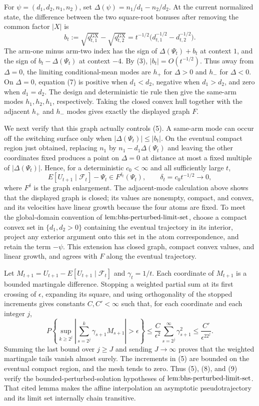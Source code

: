 For \(\psi=(d_1,d_2,n_1,n_2)\), set \(\Delta(\psi)=n_1/d_1-n_2/d_2\). At the current normalized state, the difference between the two square-root bonuses after removing the common factor \(|X|\) is
\[
 b_t:=\sqrt{q^{\mathrm{GX}}_{t,1}}-\sqrt{q^{\mathrm{GX}}_{t,2}}
 =t^{-1/2}\bigl(d_{t,1}^{-1/2}-d_{t,2}^{-1/2}\bigr). \tag{7}
\]
The arm-one minus arm-two index has the sign of \(\Delta(\Psi_t)+b_t\) at context \(1\), and the sign of \(b_t-\Delta(\Psi_t)\) at context \(-4\). By (3), \(|b_t|=O(t^{-1/2})\). Thus away from \(\Delta=0\), the limiting conditional-mean modes are \(h_+\) for \(\Delta>0\) and \(h_-\) for \(\Delta<0\). On \(\Delta=0\), equation (7) is positive when \(d_1<d_2\), negative when \(d_1>d_2\), and zero when \(d_1=d_2\). The design and deterministic tie rule then give the same-arm modes \(h_1,h_2,h_1\), respectively. Taking the closed convex hull together with the adjacent \(h_+\) and \(h_-\) modes gives exactly the displayed graph \(F\).

We next verify that this graph actually controls (5). A same-arm mode can occur off the switching surface only when \(|\Delta(\Psi_t)|\le |b_t|\). On the eventual compact region just obtained, replacing \(n_1\) by \(n_1-d_1\Delta(\Psi_t)\) and leaving the other coordinates fixed produces a point on \(\Delta=0\) at distance at most a fixed multiple of \(|\Delta(\Psi_t)|\). Hence, for a deterministic \(c_0<\infty\) and all sufficiently large \(t\),
\[
 E[U_{t+1}\mid\mathcal F_t]-\Psi_t\in F^{\delta_t}(\Psi_t),
 \qquad \delta_t=c_0t^{-1/2}\longrightarrow0, \tag{8}
\]
where \(F^\delta\) is the graph enlargement. The adjacent-mode calculation above shows that the displayed graph is closed; its values are nonempty, compact, and convex, and its velocities have linear growth because the four atoms are fixed. To meet the global-domain convention of \(\textnormal{lem:bhs-perturbed-limit-set}\), choose a compact convex set in \(\{d_1,d_2>0\}\) containing the eventual trajectory in its interior, project any exterior argument onto this set in the atom correspondence, and retain the term \(-\psi\). This extension has closed graph, compact convex values, and linear growth, and agrees with \(F\) along the eventual trajectory.

Let \(M_{t+1}=U_{t+1}-E[U_{t+1}\mid\mathcal F_t]\) and \(\gamma_t=1/t\). Each coordinate of \(M_{t+1}\) is a bounded martingale difference. Stopping a weighted partial sum at its first crossing of \(\epsilon\), expanding its square, and using orthogonality of the stopped increments gives constants \(C,C'<\infty\) such that, for each coordinate and each integer \(j\),
\[
 P\left\{\sup_{k\ge2^j}\left|\sum_{s=2^j}^k\gamma_{s+1}M_{s+1}\right|>\epsilon\right\}
 \le \frac{C}{\epsilon^2}\sum_{s=2^j}^{\infty}\gamma_{s+1}^2
 \le\frac{C'}{\epsilon^22^j}. \tag{9}
\]
Summing the last bound over \(j\ge J\) and sending \(J\to\infty\) proves that the weighted martingale tails vanish almost surely. The increments in (5) are bounded on the eventual compact region, and the mesh tends to zero. Thus (5), (8), and (9) verify the bounded-perturbed-solution hypotheses of \(\textnormal{lem:bhs-perturbed-limit-set}\). That cited lemma makes the affine interpolation an asymptotic pseudotrajectory and its limit set internally chain transitive.

